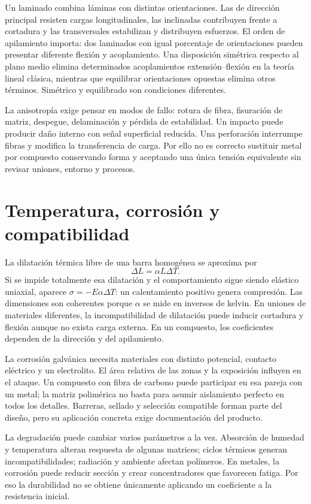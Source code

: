 Un laminado combina láminas con distintas orientaciones. Las de dirección principal resisten cargas longitudinales, las inclinadas contribuyen frente a cortadura y las transversales estabilizan y distribuyen esfuerzos. El orden de apilamiento importa: dos laminados con igual porcentaje de orientaciones pueden presentar diferente flexión y acoplamiento. Una disposición simétrica respecto al plano medio elimina determinados acoplamientos extensión--flexión en la teoría lineal clásica, mientras que equilibrar orientaciones opuestas elimina otros términos. Simétrico y equilibrado son condiciones diferentes.

La anisotropía exige pensar en modos de fallo: rotura de fibra, fisuración de matriz, despegue, delaminación y pérdida de estabilidad. Un impacto puede producir daño interno con señal superficial reducida. Una perforación interrumpe fibras y modifica la transferencia de carga. Por ello no es correcto sustituir metal por compuesto conservando forma y aceptando una única tensión equivalente sin revisar uniones, entorno y procesos.

\section{Temperatura, corrosión y compatibilidad}
La dilatación térmica libre de una barra homogénea se aproxima por
\begin{equation}
 \Delta L=\alpha L\Delta T.
\end{equation}
Si se impide totalmente esa dilatación y el comportamiento sigue siendo elástico uniaxial, aparece $\sigma=-E\alpha\Delta T$: un calentamiento positivo genera compresión. Las dimensiones son coherentes porque $\alpha$ se mide en inversos de kelvin. En uniones de materiales diferentes, la incompatibilidad de dilatación puede inducir cortadura y flexión aunque no exista carga externa. En un compuesto, los coeficientes dependen de la dirección y del apilamiento.

La corrosión galvánica necesita materiales con distinto potencial, contacto eléctrico y un electrolito. El área relativa de las zonas y la exposición influyen en el ataque. Un compuesto con fibra de carbono puede participar en esa pareja con un metal; la matriz polimérica no basta para asumir aislamiento perfecto en todos los detalles. Barreras, sellado y selección compatible forman parte del diseño, pero su aplicación concreta exige documentación del producto.

La degradación puede cambiar varios parámetros a la vez. Absorción de humedad y temperatura alteran respuesta de algunas matrices; ciclos térmicos generan incompatibilidades; radiación y ambiente afectan polímeros. En metales, la corrosión puede reducir sección y crear concentradores que favorecen fatiga. Por eso la durabilidad no se obtiene únicamente aplicando un coeficiente a la resistencia inicial.

